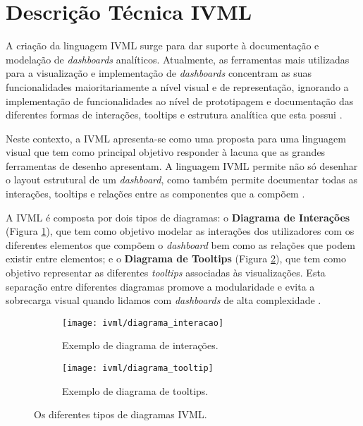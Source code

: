 \section{Descrição Técnica IVML} %
\label{sec:esp_ivml}

A criação da linguagem \gls{IVML} surge para dar suporte à documentação e modelação de \textit{dashboards} analíticos. Atualmente, as ferramentas mais utilizadas para a visualização e implementação de \textit{dashboards} concentram as suas funcionalidades maioritariamente a nível visual e de representação, ignorando a implementação de funcionalidades ao nível de prototipagem e documentação das diferentes formas de interações, tooltips e estrutura analítica que esta possui \cite{Ferreira2023IVML}.

Neste contexto, a \gls{IVML} apresenta-se como uma proposta para uma linguagem visual que tem como principal objetivo responder à lacuna que as grandes ferramentas de desenho apresentam. A linguagem \gls{IVML} permite não só desenhar o layout estrutural de um \textit{dashboard}, como também permite documentar todas as interações, tooltips e relações entre as componentes que a compõem \cite{Ferreira2023IVML}. 

A \gls{IVML} é composta por dois tipos de diagramas: o \textbf{Diagrama de Interações} (Figura \ref{fig:interacao}), que tem como objetivo modelar as interações dos utilizadores com os diferentes elementos que compõem o \textit{dashboard} bem como as relações que podem existir entre elementos; e o \textbf{Diagrama de Tooltips} (Figura \ref{fig:tooltip}), que tem como objetivo representar as diferentes \textit{tooltips} associadas às visualizações. Esta separação entre diferentes diagramas promove a modularidade e evita a sobrecarga visual quando lidamos com \textit{dashboards} de alta complexidade \cite{Ferreira2023IVML}.

\begin{figure}[htbp]
  \centering
  \begin{subfigure}[b]{0.45\textwidth}
    \texttt{[image: ivml/diagrama\_interacao]}
    \caption{Exemplo de diagrama de interações.}
    \label{fig:interacao}
  \end{subfigure}
  \hfill
  \begin{subfigure}[b]{0.45\textwidth}
    \texttt{[image: ivml/diagrama\_tooltip]}
    \caption{Exemplo de diagrama de tooltips.}
    \label{fig:tooltip}
  \end{subfigure}
  \caption{Os diferentes tipos de diagramas IVML.}
  \label{fig:diagramas_ivml}
\end{figure}

